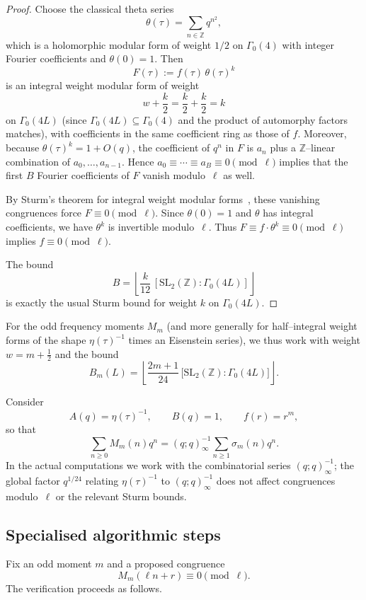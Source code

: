 \documentclass[11pt]{article}
\theoremstyle{definition}
\theoremstyle{remark}
\begin{document}
\begin{proof}
Choose the classical theta series
\[
\theta(\tau)=\sum_{n\in\mathbb{Z}}q^{n^2},
\]
which is a holomorphic modular form of weight $1/2$ on $\Gamma_0(4)$ with
integer Fourier coefficients and $\theta(0)=1$.  Then
\[
F(\tau):=f(\tau)\,\theta(\tau)^{k}
\]
is an integral weight modular form of weight
\[
w+\frac{k}{2}=\frac{k}{2}+\frac{k}{2}=k
\]
on $\Gamma_0(4L)$ (since $\Gamma_0(4L)\subseteq\Gamma_0(4)$ and the product of
automorphy factors matches), with coefficients in the same coefficient ring as
those of $f$.  Moreover, because $\theta(\tau)^{k}=1+O(q)$, the coefficient of
$q^n$ in $F$ is $a_n$ plus a $\mathbb{Z}$--linear combination of $a_0,\dots,a_{n-1}$.
Hence $a_0\equiv\cdots\equiv a_B\equiv 0\pmod{\ell}$ implies that the first $B$
Fourier coefficients of $F$ vanish modulo~$\ell$ as well.

By Sturm's theorem for integral weight modular forms~\cite{Sturm1987}, these
vanishing congruences force $F\equiv0\pmod{\ell}$.  Since $\theta(0)=1$ and
$\theta$ has integral coefficients, we have $\theta^k$ is invertible modulo~$\ell$.  Thus
$F\equiv f\cdot \theta^k\equiv 0\pmod{\ell}$ implies $f\equiv 0\pmod{\ell}$.

The bound
\[
B=\left\lfloor \frac{k}{12}\,[\mathrm{SL}_2(\mathbb{Z}):\Gamma_0(4L)]\right\rfloor
\]
is exactly the usual Sturm bound for weight $k$ on $\Gamma_0(4L)$.
\end{proof}


For the odd frequency moments $M_m$ (and more generally for half--integral
weight forms of the shape $\eta(\tau)^{-1}$ times an Eisenstein series),
we thus work with weight $w=m+\tfrac12$ and the bound
\[
B_m(L)
=\left\lfloor\frac{2m+1}{24}\,
  \bigl[\mathrm{SL}_2(\mathbb{Z}):\Gamma_0(4L)\bigr]\right\rfloor.
\]

Consider
\[
A(q)=\eta(\tau)^{-1},\qquad B(q)=1,\qquad f(r)=r^m,
\]
so that
\[
\sum_{n\ge0} M_m(n)q^n
=(q;q)_\infty^{-1}\sum_{n\ge1}\sigma_m(n)q^n.
\]
In the actual computations we work with the combinatorial series
$(q;q)_\infty^{-1}$; the global factor $q^{1/24}$ relating
$\eta(\tau)^{-1}$ to $(q;q)_\infty^{-1}$ does not affect congruences
modulo~$\ell$ or the relevant Sturm bounds.

\subsection{Specialised algorithmic steps}

Fix an odd moment $m$ and a proposed congruence
\[
M_m(\ell n + r)\equiv0\pmod{\ell}.
\]
The verification proceeds as follows.
\end{document}

